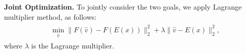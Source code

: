 



\noindent \textbf{Joint Optimization.} To jointly consider the two goals, we apply Lagrange multiplier method, as follows:
\begin{align}
\label{eq:lagrange version}
\begin{aligned}
    & \min_{\hat{v}}  \| F(\hat{v})-F(E(x)) \|_2^2+ \lambda \|\hat{v}-E(x)\|_2^2,
\end{aligned}
\end{align}
where $\lambda$ is the Lagrange multiplier. 






